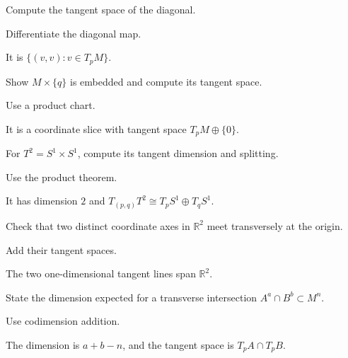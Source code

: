 \begin{exercise}\label{exr:vii06-20}
Compute the tangent space of the diagonal.
\end{exercise}
\begin{hint}
Differentiate the diagonal map.
\end{hint}
\begin{solution}
It is \(\{(v,v):v\in T_pM\}\).
\end{solution}

\begin{exercise}\label{exr:vii06-21}
Show \(M\times\{q\}\) is embedded and compute its tangent space.
\end{exercise}
\begin{hint}
Use a product chart.
\end{hint}
\begin{solution}
It is a coordinate slice with tangent space \(T_pM\oplus\{0\}\).
\end{solution}

\begin{exercise}\label{exr:vii06-22}
For \(T^2=S^1\times S^1\), compute its tangent dimension and splitting.
\end{exercise}
\begin{hint}
Use the product theorem.
\end{hint}
\begin{solution}
It has dimension \(2\) and \(T_{(p,q)}T^2\cong T_pS^1\oplus T_qS^1\).
\end{solution}

\begin{exercise}\label{exr:vii06-23}
Check that two distinct coordinate axes in \(\mathbb R^2\) meet transversely at the origin.
\end{exercise}
\begin{hint}
Add their tangent spaces.
\end{hint}
\begin{solution}
The two one-dimensional tangent lines span \(\mathbb R^2\).
\end{solution}

\begin{exercise}\label{exr:vii06-24}
State the dimension expected for a transverse intersection \(A^a\cap B^b\subset M^n\).
\end{exercise}
\begin{hint}
Use codimension addition.
\end{hint}
\begin{solution}
The dimension is \(a+b-n\), and the tangent space is \(T_pA\cap T_pB\).
\end{solution}


